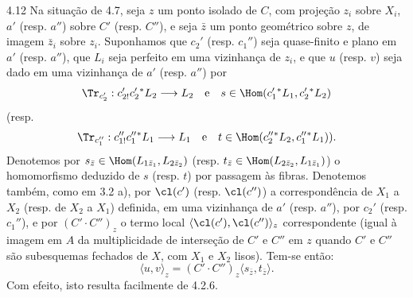 \begin{statement}{4.12}
Na situação de 4.7, seja $z$ um ponto isolado de $C$, com projeção $z_i$ sobre $X_i$, $a'$ (resp. $a''$) sobre $C'$ (resp. $C''$), e seja $\bar z$ um ponto geométrico sobre $z$, de imagem $\bar z_i$ sobre $z_i$. Suponhamos que $c_2'$ (resp. $c_1''$) seja quase-finito e plano em $a'$ (resp. $a''$), que $L_i$ seja perfeito em uma vizinhança de $z_i$, e que $u$ (resp. $v$) seja dado em uma vizinhança de $a'$ (resp. $a''$) por
\[
\Tr_{c_2'}:c_{2!}'c_2'{}^*L_2\longrightarrow L_2
\quad\text{e}\quad
s\in\Hom(c_1'{}^*L_1,c_2'{}^*L_2)
\]
(resp.
\[
\Tr_{c_1''}:c_{1!}''c_1''{}^*L_1\longrightarrow L_1
\quad\text{e}\quad
t\in\Hom(c_2''{}^*L_2,c_1''{}^*L_1)).
\]
Denotemos por $s_{\bar z}\in\Hom(L_{1\bar z_1},L_{2\bar z_2})$ (resp. $t_{\bar z}\in\Hom(L_{2\bar z_2},L_{1\bar z_1})$) o homomorfismo deduzido de $s$ (resp. $t$) por passagem às fibras. Denotemos também, como em 3.2 a), por $\cl(c')$ (resp. $\cl(c'')$) a correspondência de $X_1$ a $X_2$ (resp. de $X_2$ a $X_1$) definida, em uma vizinhança de $a'$ (resp. $a''$), por $c_2'$ (resp. $c_1''$), e por $(C'\!\cdot C'')_z$ o termo local $\langle\cl(c'),\cl(c'')\rangle_z$ correspondente (igual à imagem em $A$ da multiplicidade de interseção de $C'$ e $C''$ em $z$ quando $C'$ e $C''$ são subesquemas fechados de $X$, com $X_1$ e $X_2$ lisos). Tem-se então:
\begin{equation}
\tag{4.12.1}
\langle u,v\rangle_z=(C'\!\cdot C'')_z\langle s_{\bar z},t_{\bar z}\rangle.
\end{equation}
Com efeito, isto resulta facilmente de 4.2.6.
\end{statement}


